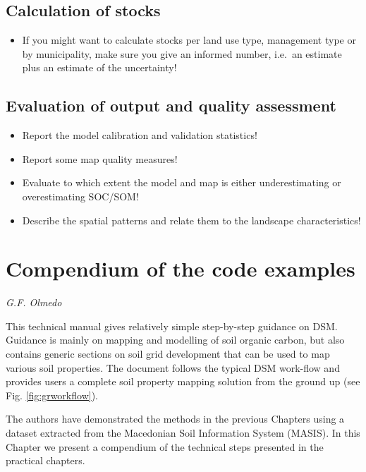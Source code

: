 \documentclass[10pt,b5paper,]{book}
\providecommand{\tightlist}{%
  \setlength{\itemsep}{0pt}\setlength{\parskip}{0pt}}
\theoremstyle{definition}
\theoremstyle{definition}
\theoremstyle{definition}
\theoremstyle{remark}
\begin{document}
\hypertarget{calculation-of-stocks}{%
\section{Calculation of stocks}\label{calculation-of-stocks}}

\begin{itemize}
\tightlist
\item
  If you might want to calculate stocks per land use type, management
  type or by municipality, make sure you give an informed number,
  i.e.~an estimate plus an estimate of the uncertainty!
\end{itemize}

\hypertarget{evaluation-of-output-and-quality-assessment}{%
\section{Evaluation of output and quality
assessment}\label{evaluation-of-output-and-quality-assessment}}

\begin{itemize}
\tightlist
\item
  Report the model calibration and validation statistics!
\item
  Report some map quality measures!
\item
  Evaluate to which extent the model and map is either underestimating
  or overestimating SOC/SOM!
\item
  Describe the spatial patterns and relate them to the landscape
  characteristics!
\end{itemize}

\hypertarget{compendium}{%
\chapter{Compendium of the code examples}\label{compendium}}

\emph{G.F. Olmedo}

This technical manual gives relatively simple step-by-step guidance on
DSM. Guidance is mainly on mapping and modelling of soil organic carbon,
but also contains generic sections on soil grid development that can be
used to map various soil properties. The document follows the typical
DSM work-flow and provides users a complete soil property mapping
solution from the ground up (see Fig. \ref{fig:grworkflow}).

The authors have demonstrated the methods in the previous Chapters using
a dataset extracted from the Macedonian Soil Information System (MASIS).
In this Chapter we present a compendium of the technical steps presented
in the practical chapters.
\end{document}
